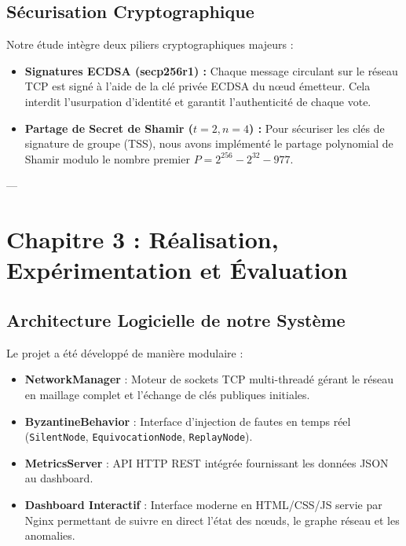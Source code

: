 \documentclass[11pt,a4paper]{article}
\begin{document}
\subsection{Sécurisation Cryptographique}
Notre étude intègre deux piliers cryptographiques majeurs :
\begin{itemize}
    \item \textbf{Signatures ECDSA (secp256r1) :} Chaque message circulant sur le réseau TCP est signé à l'aide de la clé privée ECDSA du nœud émetteur. Cela interdit l'usurpation d'identité et garantit l'authenticité de chaque vote.
    \item \textbf{Partage de Secret de Shamir ($t=2, n=4$) :} Pour sécuriser les clés de signature de groupe (TSS), nous avons implémenté le partage polynomial de Shamir modulo le nombre premier $P = 2^{256} - 2^{32} - 977$.
\end{itemize}

---

\section{Chapitre 3 : Réalisation, Expérimentation et Évaluation}

\subsection{Architecture Logicielle de notre Système}
Le projet a été développé de manière modulaire :
\begin{itemize}
    \item \textbf{NetworkManager} : Moteur de sockets TCP multi-threadé gérant le réseau en maillage complet et l'échange de clés publiques initiales.
    \item \textbf{ByzantineBehavior} : Interface d'injection de fautes en temps réel (\texttt{SilentNode}, \texttt{EquivocationNode}, \texttt{ReplayNode}).
    \item \textbf{MetricsServer} : API HTTP REST intégrée fournissant les données JSON au dashboard.
    \item \textbf{Dashboard Interactif} : Interface moderne en HTML/CSS/JS servie par Nginx permettant de suivre en direct l'état des nœuds, le graphe réseau et les anomalies.
\end{itemize}
\end{document}
